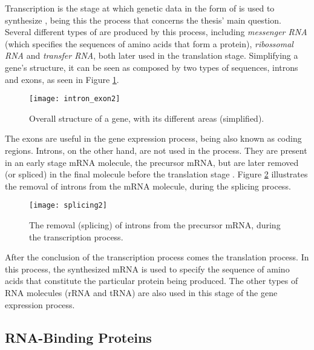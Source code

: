 Transcription is the stage at which genetic data in the form of \dna{} is used
to synthesize \rna{}, being this the process that concerns the thesis' main
question. Several different types of \rna{} are produced by this process,
including \emph{messenger RNA} (which specifies the sequences of amino acids that form a
protein), \emph{ribossomal RNA} and \emph{transfer RNA}, both later used in the translation stage. Simplifying
a gene's structure, it can be seen as composed by two types of sequences,
introns and exons, as seen in Figure \ref{fig:intron_exon}.

\begin{figure}[!htb]
  \begin{center}
    \leavevmode
    \texttt{[image: intron\_exon2]}
    \caption[Overall structure of a gene]{Overall structure of a gene, with its
    different areas (simplified).}
    \label{fig:intron_exon}
  \end{center}
\end{figure}

The exons are useful in the gene expression process, being also known as coding
regions. Introns, on the other hand, are not used in the process. They are
present in an early stage mRNA molecule, the precursor mRNA, but are later
removed (or spliced) in the final molecule before the translation stage
\cite{leic:gene_expr}. Figure \ref{fig:splicing} illustrates the removal of
introns from the mRNA molecule, during the  splicing process.

\begin{figure}[!htb]
  \begin{center}
    \leavevmode
    \texttt{[image: splicing2]}
    \caption[Removal of introns from precursor mRNA]{The removal (splicing) of
    introns from the precursor mRNA, during the transcription process.}
    \label{fig:splicing}
  \end{center}
\end{figure}

After the conclusion of the transcription process comes the translation process.
In this process, the synthesized mRNA is used to specify the sequence of amino
acids that constitute the particular protein being produced. The other types of
RNA molecules (rRNA and tRNA) are also used in this stage of the gene expression
process.

\subsection{RNA-Binding Proteins}

